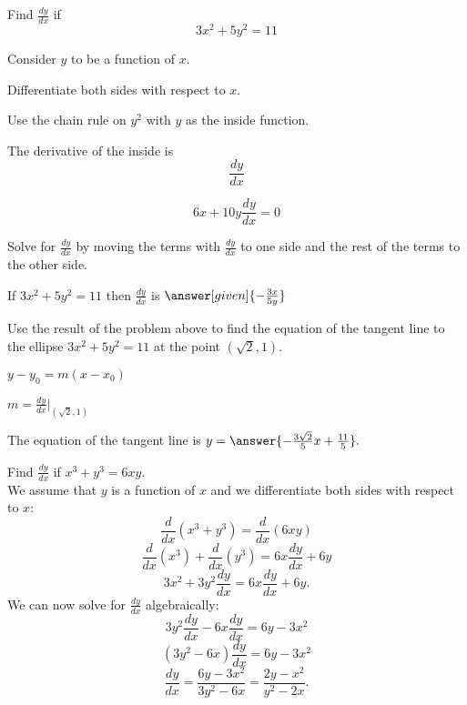 \documentclass{ximera}
\begin{document}
\begin{center}
\begin{foldable}
\end{foldable}
\end{center}


\begin{problem} %
  Find $\frac{dy}{dx}$ if
  \[
  3x^2 + 5y^2 = 11
  \]
  
	  
    \begin{hint}
      Consider $y$ to be a function of $x$.
    \end{hint}
		\begin{hint}
		  Differentiate both sides with respect to $x$.
		\end{hint}
    \begin{hint}
      Use the chain rule on $y^2$ with $y$ as the inside function.
    \end{hint}
    \begin{hint}
      The derivative of the inside is 
      \[
      \frac{dy}{dx}
      \]
    \end{hint}
		\begin{hint}
		  \[
			6x + 10y\frac{dy}{dx} = 0
			\]
		\end{hint}
		\begin{hint}
		  Solve for $\frac{dy}{dx}$ by moving the terms with $\frac{dy}{dx}$ to one side and the 
			rest of the terms to the other side.
		\end{hint}
    
		If $3x^2 + 5y^2 = 11$ then $\frac{dy}{dx}$ is
		 $\answer[given]{-\frac{3x}{5y}}$
		
\end{problem}


\begin{problem}
Use the result of the problem above to find the equation of the tangent line to the ellipse $3x^2 + 5y^2 = 11$ at the point $(\sqrt 2,1).$

\begin{hint}
$y-y_0 = m(x-x_0)$
\end{hint}
\begin{hint}
$m = \frac{dy}{dx}\bigg|_{(\sqrt 2, 1)}$
\end{hint}
The equation of the tangent line is $y = \answer{-\frac{3\sqrt 2}{5} x + \frac{11}{5}}.$
\end{problem}



\begin{example} %
Find  $\frac{dy}{dx}$ if $x^3 + y^3 =6xy$.\\
We assume that $y$ is a function of $x$ and we differentiate both 
sides with respect to $x$:
\[\frac{d}{dx}(x^3 + y^3)  = \frac{d}{dx} (6xy)\]
\[\frac{d}{dx}(x^3) + \frac{d}{dx}(y^3)  = 6x\frac{dy}{dx} + 6y\]
\[3x^2 + 3y^2\frac{dy}{dx}  = 6x\frac{dy}{dx} + 6y.\]
We can now solve for $\displaystyle{\frac{dy}{dx}}$ algebraically:
\[3y^2\frac{dy}{dx}  - 6x\frac{dy}{dx} = 6y-3x^2\]
\[(3y^2- 6x)\frac{dy}{dx}   = 6y-3x^2\]
\[\frac{dy}{dx}   = \frac{6y-3x^2}{3y^2- 6x} = \frac{2y-x^2}{y^2- 2x}.\]
\end{example}
\end{document}
